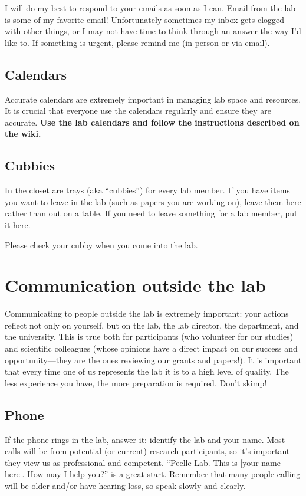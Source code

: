 \documentclass[letterpaper,12pt,oneside]{memoir}
\begin{document}
I will do my best to respond to your emails as soon as I can. Email from the lab is some of my favorite email! Unfortunately sometimes my inbox gets clogged with other things, or I may not have time to think through an answer the way I'd like to. If something is urgent, please remind me (in person or via email). 

\subsection{Calendars}

Accurate calendars are extremely important in managing lab space and resources. It is crucial that everyone use the calendars regularly and ensure they are accurate. \textbf{Use the lab calendars and follow the instructions described on the wiki.}


\subsection{Cubbies}

In the closet are trays (aka ``cubbies'') for every lab member. If you have items you want to leave in the lab (such as papers you are working on), leave them here rather than out on a table. If you need to leave something for a lab member, put it here.

Please check your cubby when you come into the lab.


\section{Communication outside the lab}

Communicating to people outside the lab is extremely important: your actions reflect not only on yourself, but on the lab, the lab director, the department, and the university. This is true both for participants (who volunteer for our studies) and scientific colleagues (whose opinions have a direct impact on our success and opportunity---they are the ones reviewing our grants and papers!). It is important that every time one of us represents the lab it is to a high level of quality. The less experience you have, the more preparation is required. Don't skimp!

\subsection{Phone}
If the phone rings in the lab, answer it: identify the lab and your name. Most calls will be from potential (or current) research participants, so it's important they view us as professional and competent. ``Peelle Lab. This is [your name here]. How may I help you?'' is a great start. Remember that many people calling will be older and/or have hearing loss, so speak slowly and clearly.
\end{document}
